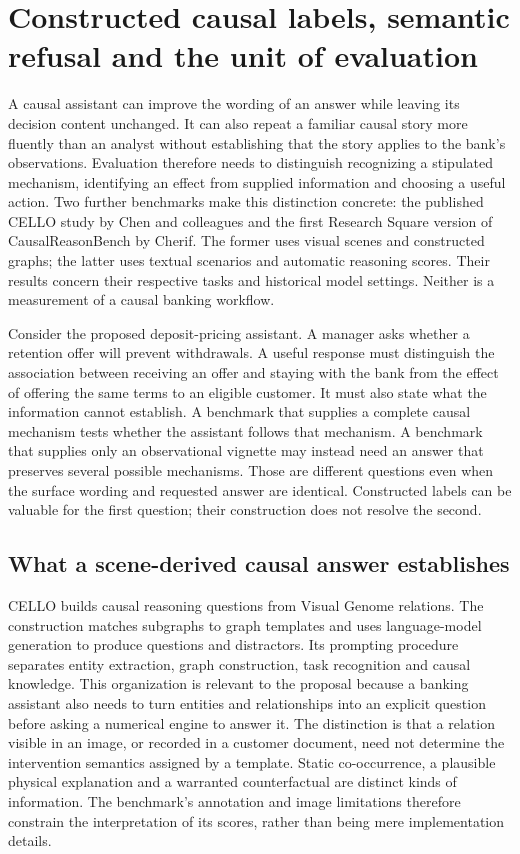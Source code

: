 \section{Constructed causal labels, semantic refusal and the unit of evaluation}
\label{exec17:benchmark-development}

A causal assistant can improve the wording of an answer while leaving its
decision content unchanged. It can also repeat a familiar causal story more
fluently than an analyst without establishing that the story applies to the
bank's observations. Evaluation therefore needs to distinguish recognizing a
stipulated mechanism, identifying an effect from supplied information and
choosing a useful action. Two further benchmarks make this distinction
concrete: the published CELLO study by Chen and colleagues and the first
Research Square version of CausalReasonBench by Cherif. The former uses visual
scenes and constructed graphs; the latter uses textual scenarios and automatic
reasoning scores. Their results concern their respective tasks and historical
model settings. Neither is a measurement of a causal banking
workflow.\citep{exec17_benchmark_cello,exec17_benchmark_cherif}

Consider the proposed deposit-pricing assistant. A manager asks whether a
retention offer will prevent withdrawals. A useful response must distinguish
the association between receiving an offer and staying with the bank from the
effect of offering the same terms to an eligible customer. It must also state
what the information cannot establish. A benchmark that supplies a complete
causal mechanism tests whether the assistant follows that mechanism. A
benchmark that supplies only an observational vignette may instead need an
answer that preserves several possible mechanisms. Those are different
questions even when the surface wording and requested answer are identical.
Constructed labels can be valuable for the first question; their construction
does not resolve the second.

\subsection{What a scene-derived causal answer establishes}

CELLO builds causal reasoning questions from Visual Genome relations. The
construction matches subgraphs to graph templates and uses language-model
generation to produce questions and distractors. Its prompting procedure
separates entity extraction, graph construction, task recognition and causal
knowledge. This organization is relevant to the proposal because a banking
assistant also needs to turn entities and relationships into an explicit
question before asking a numerical engine to answer it. The distinction is
that a relation visible in an image, or recorded in a customer document, need
not determine the intervention semantics assigned by a template. Static
co-occurrence, a plausible physical explanation and a warranted counterfactual
are distinct kinds of information. The benchmark's annotation and image
limitations therefore constrain the interpretation of its scores, rather than
being mere implementation details.\citep{exec17_benchmark_cello}

